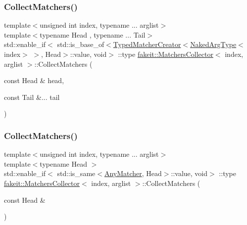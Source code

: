 \subsubsection{\texorpdfstring{CollectMatchers()}{CollectMatchers()}\hspace{0.1cm}{\footnotesize\ttfamily [5/63]}}
{\footnotesize\ttfamily template$<$unsigned int index, typename ... arglist$>$ \\
template$<$typename Head , typename ... Tail$>$ \\
std\+::enable\+\_\+if$<$ std\+::is\+\_\+base\+\_\+of$<$\mbox{\hyperlink{structfakeit_1_1TypedMatcherCreator}{Typed\+Matcher\+Creator}}$<$\mbox{\hyperlink{classfakeit_1_1MatchersCollector_aeda8ced6a2f0cb7c6e4f916f18a91730}{Naked\+Arg\+Type}}$<$index$>$ $>$, Head$>$\+::value, void$>$ \+::type \mbox{\hyperlink{classfakeit_1_1MatchersCollector}{fakeit\+::\+Matchers\+Collector}}$<$ index, arglist $>$\+::Collect\+Matchers (\begin{DoxyParamCaption}\item[{const Head \&}]{head,  }\item[{const Tail \&...}]{tail }\end{DoxyParamCaption})\hspace{0.3cm}{\ttfamily [inline]}}

\mbox{\label{classfakeit_1_1MatchersCollector_a2abc3ce9cdbc60cd54f5864443426743}} 
\subsubsection{\texorpdfstring{CollectMatchers()}{CollectMatchers()}\hspace{0.1cm}{\footnotesize\ttfamily [6/63]}}
{\footnotesize\ttfamily template$<$unsigned int index, typename ... arglist$>$ \\
template$<$typename Head $>$ \\
std\+::enable\+\_\+if$<$ std\+::is\+\_\+same$<$\mbox{\hyperlink{structfakeit_1_1AnyMatcher}{Any\+Matcher}}, Head$>$\+::value, void$>$ \+::type \mbox{\hyperlink{classfakeit_1_1MatchersCollector}{fakeit\+::\+Matchers\+Collector}}$<$ index, arglist $>$\+::Collect\+Matchers (\begin{DoxyParamCaption}\item[{const Head \&}]{ }\end{DoxyParamCaption})\hspace{0.3cm}{\ttfamily [inline]}}

